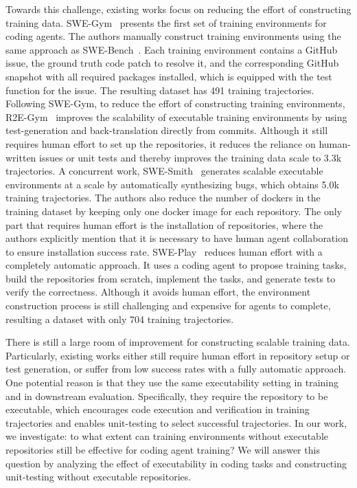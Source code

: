 \documentclass[12pt,openany]{cmuthesis}
\begin{document}
Towards this challenge, existing works focus on reducing the effort of constructing training data.
SWE-Gym~\cite{swegym} presents the first set of training environments for coding agents. The authors manually construct training environments using the same approach as SWE-Bench~\cite{swebench}. Each training environment contains a GitHub issue, the ground truth code patch to resolve it, and the corresponding GitHub snapshot with all required packages installed, which is equipped with the test function for the issue. The resulting dataset has 491 training trajectories.
Following SWE-Gym, to reduce the effort of constructing training environments, R2E-Gym~\cite{R2EGym} improves the scalability of executable training environments by using test-generation and back-translation directly from commits. Although it still requires human effort to set up the repositories, it reduces the reliance on human-written issues or unit tests and thereby improves the training data scale to 3.3k trajectories.
A concurrent work, SWE-Smith~\cite{swe-smith} generates scalable executable environments at a scale by automatically synthesizing bugs, which obtains 5.0k training trajectories. The authors also reduce the number of dockers in the training dataset by keeping only one docker image for each repository.
The only part that requires human effort is the installation of repositories, where the authors explicitly mention that it is necessary to have human agent collaboration to ensure installation success rate.
SWE-Play~\cite{swe-play} reduces human effort with a completely automatic approach. It uses a coding agent to propose training tasks, build the repositories from scratch, implement the tasks, and generate tests to verify the correctness. Although it avoids human effort, the environment construction process is still challenging and expensive for agents to complete, resulting a dataset with only 704 training trajectories.

There is still a large room of improvement for constructing scalable training data. Particularly, existing works either still require human effort in repository setup or test generation, or suffer from low success rates with a fully automatic approach.
One potential reason is that they use the same executability setting in training and in downstream evaluation. Specifically, they require the repository to be executable, which encourages code execution and verification in training trajectories and enables unit-testing to select successful trajectories.
In our work, we investigate: to what extent can training environments without executable repositories still be effective for coding agent training?
We will answer this question by analyzing the effect of executability in coding tasks and constructing unit-testing without executable repositories.
\end{document}
